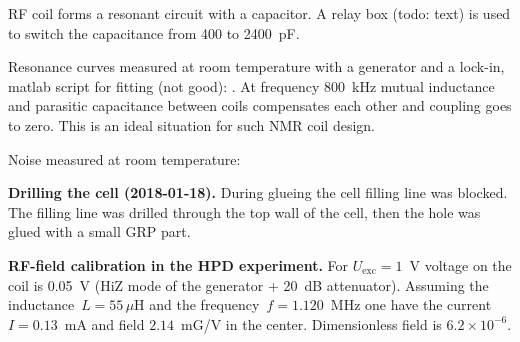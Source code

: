 \documentclass[a4paper]{article}
\begin{document}



RF coil forms a resonant circuit with a capacitor. A relay box (todo: text)
is used to switch the capacitance from 400 to 2400~pF.

Resonance curves measured at room temperature with a generator and a
lock-in, matlab script for fitting (not good):
. At frequency 800~kHz mutual inductance
and parasitic capacitance between coils compensates each other and
coupling goes to zero. This is an ideal situation for such
NMR coil design.


Noise measured at room temperature:\\


{\bf Drilling the cell (2018-01-18).} During glueing the cell filling line
was blocked. The filling line was drilled through the top wall of the cell,
then the hole was glued with a small GRP part.


{\bf RF-field calibration in the HPD experiment.} For $U_{\mbox{exc}}=1$~V
voltage on the coil is 0.05~V (HiZ mode of the generator + 20~dB
attenuator). Assuming the inductance~$L=55\,\mu$H and the
frequency~$f=1.120$~MHz one have the current~$I=0.13$~mA and field
$2.14$~mG/V in the center. Dimensionless field is $6.2\times10^{-6}$.
\end{document}
